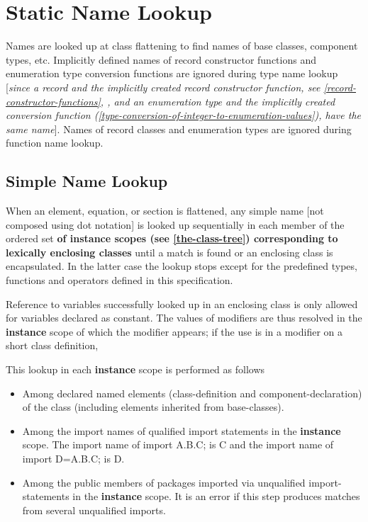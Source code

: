 \section{Static Name Lookup}

Names are looked up at class flattening to find names of base classes,
component types, etc. Implicitly defined names of record constructor
functions and enumeration type conversion functions are ignored during
type name lookup {[}\emph{since a record and the implicitly created
record constructor function, see \ref{record-constructor-functions}, , and an
enumeration type and the implicitly created conversion function
(\ref{type-conversion-of-integer-to-enumeration-values}), have the same name}{]}. Names of record
classes and enumeration types are ignored during function name lookup.

\subsection{Simple Name Lookup}

When an element, equation, or section is flattened, any simple name
  {[}not composed using dot notation{]} is looked up sequentially in each
member of the ordered set \textbf{of instance scopes (see 
\ref{the-class-tree}) corresponding to lexically enclosing classes} until a
match is found or an enclosing class is encapsulated. In the latter case
the lookup stops except for the predefined types, functions and
operators defined in this specification.

Reference to variables successfully looked up in an enclosing class is
only allowed for variables declared as constant. The values of modifiers
are thus resolved in the \textbf{instance} scope of which the modifier
appears; if the use is in a modifier on a short class definition,

This lookup in each \textbf{instance} scope is performed as follows

\begin{itemize}
\item
  Among declared named elements (class-definition and
  component-declaration) of the class (including elements inherited from
  base-classes).
\item
  Among the import names of qualified import statements in the
  \textbf{instance} scope. The import name of import A.B.C; is C and the
  import name of import D=A.B.C; is D.
\item
  Among the public members of packages imported via unqualified
  import-statements in the \textbf{instance} scope. It is an error if
  this step produces matches from several unqualified imports.
\end{itemize}


